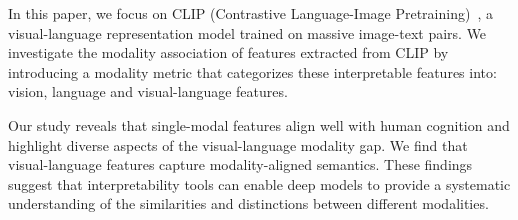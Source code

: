 In this paper, we focus on CLIP (Contrastive Language-Image Pretraining)~\citep{radford2021learning}, a visual-language representation model trained on massive image-text pairs. We investigate the modality association of features extracted from CLIP by introducing a modality metric that categorizes these interpretable features into: vision, language and visual-language features.

Our study reveals that single-modal features align well with human cognition and highlight diverse aspects of the visual-language modality gap. We find that visual-language features capture modality-aligned semantics. These findings suggest that interpretability tools can enable deep models to provide a systematic understanding of the similarities and distinctions between different modalities.









